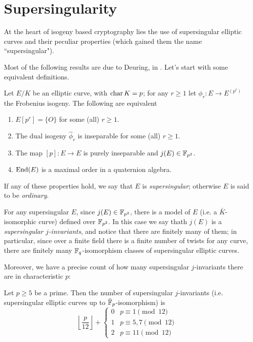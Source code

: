 \section{Supersingularity}

At the heart of isogeny based cryptography lies the use of supersingular elliptic curves and their peculiar properties (which gained them the name ``supersingular").

Most of the following results are due to Deuring, in \cite{Deuring1941}. Let's start with some equivalent definitions.
\begin{theorem}
    Let $E/K$ be an elliptic curve, with $\operatorname{char} K=p$; for any $r\ge1$ let $\phi_r:E\to E^{(p^r)}$ the Frobenius isogeny. The following are equivalent
    \begin{enumerate}
        \item $E[p^r]=\{O\}$ for some (all) $r\ge1$.
        \item The dual isogeny $\hat\phi_r$ is inseparable for some (all) $r\ge1$.
        \item The map $[p]:E\to E$ is purely inseparable and $j(E)\in\mathbb{F}_{p^2}$.
        \item $\operatorname{End}(E)$ is a maximal order in a quaternion algebra.
    \end{enumerate}
    If any of these properties hold, we say that $E$ is \emph{supersingular}; otherwise $E$ is said to be \emph{ordinary}.
\end{theorem}

For any supersingular $E$, since $j(E)\in\mathbb{F}_{p^2}$, there is a model of $E$ (i.e. a $\bar K$-isomorphic curve) defined over $\mathbb{F}_{p^2}$. In this case we say thath $j(E)$ is a \emph{supersingular $j$-invariants}, and notice that there are finitely many of them; in particular, since over a finite field there is a finite number of twists for any curve, there are finitely many $\mathbb{F}_q$-isomorphism classes of supersingular elliptic curves.

Moreover, we have a precise count of how many supersingular $j$-invariants there are in characteristic $p$:
\begin{theorem}
    Let $p\ge5$ be a prime. Then the number of supersingular $j$-invariants (i.e. supersingular elliptic curves up to $\bar{\mathbb{F}}_p$-isomorphism) is
    $$\left\lfloor \frac{p}{12} \right\rfloor + \begin{cases}
    0 & p\equiv1\pmod{12}\\
    1 & p\equiv5,7\pmod{12}\\
    2 & p\equiv11\pmod{12}
    \end{cases}$$
\end{theorem}

